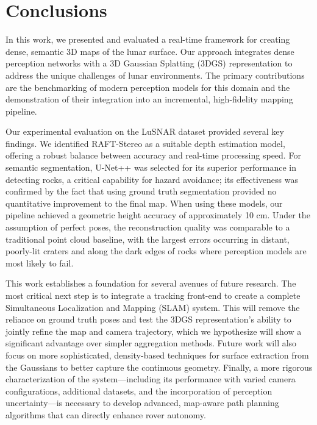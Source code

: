 \section{Conclusions}
\label{sec:conclusion}
In this work, we presented and evaluated a real-time framework for creating dense, semantic 3D maps of the lunar surface. Our approach integrates dense perception networks with a 3D Gaussian Splatting (3DGS) representation to address the unique challenges of lunar environments. The primary contributions are the benchmarking of modern perception models for this domain and the demonstration of their integration into an incremental, high-fidelity mapping pipeline.

Our experimental evaluation on the LuSNAR dataset provided several key findings. We identified RAFT-Stereo as a suitable depth estimation model, offering a robust balance between accuracy and real-time processing speed. For semantic segmentation, U-Net++ was selected for its superior performance in detecting rocks, a critical capability for hazard avoidance; its effectiveness was confirmed by the fact that using ground truth segmentation provided no quantitative improvement to the final map. When using these models, our pipeline achieved a geometric height accuracy of approximately 10 cm. Under the assumption of perfect poses, the reconstruction quality was comparable to a traditional point cloud baseline, with the largest errors occurring in distant, poorly-lit craters and along the dark edges of rocks where perception models are most likely to fail.

This work establishes a foundation for several avenues of future research. The most critical next step is to integrate a tracking front-end to create a complete Simultaneous Localization and Mapping (SLAM) system. This will remove the reliance on ground truth poses and test the 3DGS representation's ability to jointly refine the map and camera trajectory, which we hypothesize will show a significant advantage over simpler aggregation methods. Future work will also focus on more sophisticated, density-based techniques for surface extraction from the Gaussians to better capture the continuous geometry. Finally, a more rigorous characterization of the system—including its performance with varied camera configurations, additional datasets, and the incorporation of perception uncertainty—is necessary to develop advanced, map-aware path planning algorithms that can directly enhance rover autonomy.